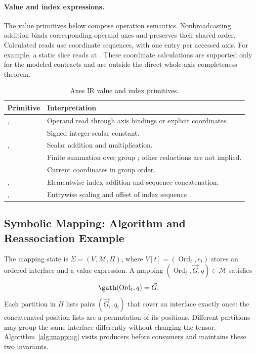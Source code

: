 \paragraph{Value and index expressions.}
\label{app:value-index-expressions}
The value primitives below compose operation semantics. Nonbroadcasting
addition binds corresponding operand axes and preserves their shared
order. Calculated reads use coordinate sequences, with one entry per
accessed axis. For example, a static slice reads at
. These coordinate calculations
are supported only for the modeled contracts and are outside the direct
whole-axis completeness theorem.
\begin{table}[!htbp]
\caption{Axes IR value and index primitives.}
\label{tab:axes-ir-value-index-primitives}
\small
\begin{tabularx}{\linewidth}{@{}lY@{}}\toprule
Primitive & Interpretation\\\midrule
{},  & Operand read through axis bindings or explicit coordinates.\\
 & Signed integer scalar constant.\\
,  & Scalar addition and multiplication.\\
 & Finite summation over group ; other reductions are not implied.\\
 & Current coordinates in group order.\\
,  & Elementwise index addition and sequence concatenation.\\
,  & Entrywise scaling and offset of index sequence .\\\bottomrule
\end{tabularx}
\end{table}

\subsection{Symbolic Mapping: Algorithm and Reassociation Example}
\label{app:symbolic-mapping-reassociation}
The mapping state is $\Sigma=(V,\mathcal M,\Pi)$, where
$V[t]=(\operatorname{Ord}_t,e_t)$ stores an ordered interface and a value expression.
A mapping $(\operatorname{Ord}_t,\vec G,q)\in\mathcal M$ satisfies
\begin{equation}
 \gath(\operatorname{Ord}_t,q)=\vec G.
 \label{extended:eq:mapping-invariant}
\end{equation}
Each partition in $\Pi$ lists pairs $(\vec G_i,q_i)$ that cover an
interface exactly once: the concatenated position lists are a permutation
of its positions. Different partitions may group the same interface
differently without changing the tensor. Algorithm~\ref{alg:mapping}
visits producers before consumers and maintains these two invariants.

